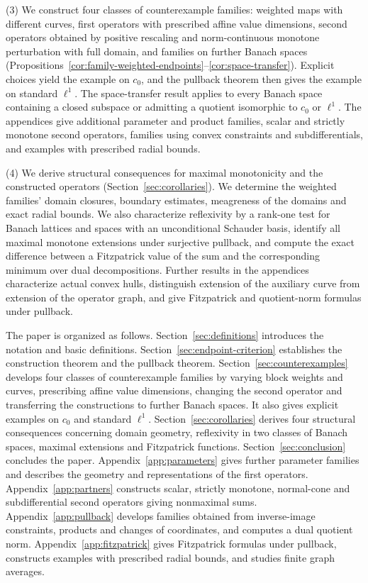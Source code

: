 \documentclass[11pt]{article}
\theoremstyle{definition}
\theoremstyle{remark}
\begin{document}
(3) We construct four classes of counterexample families: weighted maps with different curves, first operators with prescribed affine value dimensions, second operators obtained by positive rescaling and norm-continuous monotone perturbation with full domain, and families on further Banach spaces (Propositions~\ref{cor:family-weighted-endpoints}--\ref{cor:space-transfer}). Explicit choices yield the example on $c_0$, and the pullback theorem then gives the example on standard $\ell^1$. The space-transfer result applies to every Banach space containing a closed subspace or admitting a quotient isomorphic to $c_0$ or $\ell^1$. The appendices give additional parameter and product families, scalar and strictly monotone second operators, families using convex constraints and subdifferentials, and examples with prescribed radial bounds. 

(4) We derive structural consequences for maximal monotonicity and the constructed operators (Section~\ref{sec:corollaries}). We determine the weighted families' domain closures, boundary estimates, meagreness of the domains and exact radial bounds. We also characterize reflexivity by a rank-one test for Banach lattices and spaces with an unconditional Schauder basis, identify all maximal monotone extensions under surjective pullback, and compute the exact difference between a Fitzpatrick value of the sum and the corresponding minimum over dual decompositions. Further results in the appendices characterize actual convex hulls, distinguish extension of the auxiliary curve from extension of the operator graph, and give Fitzpatrick and quotient-norm formulas under pullback. 

The paper is organized as follows. Section~\ref{sec:definitions} introduces the notation and basic definitions. Section~\ref{sec:endpoint-criterion} establishes the construction theorem and the pullback theorem. Section~\ref{sec:counterexamples} develops four classes of counterexample families by varying block weights and curves, prescribing affine value dimensions, changing the second operator and transferring the constructions to further Banach spaces. It also gives explicit examples on $c_0$ and standard $\ell^1$. Section~\ref{sec:corollaries} derives four structural consequences concerning domain geometry, reflexivity in two classes of Banach spaces, maximal extensions and Fitzpatrick functions. Section~\ref{sec:conclusion} concludes the paper. Appendix~\ref{app:parameters} gives further parameter families and describes the geometry and representations of the first operators. Appendix~\ref{app:partners} constructs scalar, strictly monotone, normal-cone and subdifferential second operators giving nonmaximal sums. Appendix~\ref{app:pullback} develops families obtained from inverse-image constraints, products and changes of coordinates, and computes a dual quotient norm. Appendix~\ref{app:fitzpatrick} gives Fitzpatrick formulas under pullback, constructs examples with prescribed radial bounds, and studies finite graph averages. 
\end{document}
